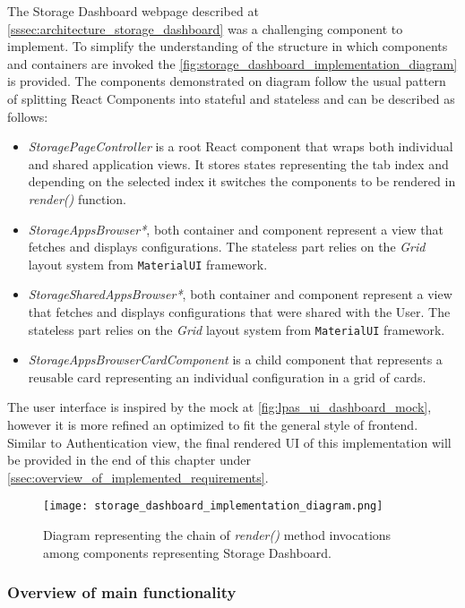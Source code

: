 The Storage Dashboard webpage described at \autoref{sssec:architecture_storage_dashboard} was a challenging component to implement. To simplify the understanding of the structure in which components and containers are invoked the \autoref{fig:storage_dashboard_implementation_diagram} is provided. The components demonstrated on diagram follow the usual pattern of splitting React Components into stateful and stateless and can be described as follows:
\begin{itemize}
	\item \textit{StoragePageController} is a root React component that wraps both individual and shared application views. It stores states representing the tab index and depending on the selected index it switches the components to be rendered in \textit{render()} function.
	\item \textit{StorageAppsBrowser*}, both container and component represent a view that fetches and displays \lpa{} configurations. The stateless part relies on the \textit{Grid} layout system from \texttt{MaterialUI} framework.
	\item \textit{StorageSharedAppsBrowser*}, both container and component represent a view that fetches and displays \lpa{} configurations that were shared with the User. The stateless part relies on the \textit{Grid} layout system from \texttt{MaterialUI} framework.
	\item \textit{StorageAppsBrowserCardComponent} is a child component that represents a reusable card representing an individual \lpa{} configuration in a grid of cards.
\end{itemize}

The user interface is inspired by the mock at \autoref{fig:lpas_ui_dashboard_mock}, however it is more refined an optimized to fit the general style of \lpa{} frontend. Similar to Authentication view, the final rendered UI of this implementation will be provided in the end of this chapter under \autoref{ssec:overview_of_implemented_requirements}.

\begin{figure}[h]
\centering
\texttt{[image: storage\_dashboard\_implementation\_diagram.png]}
\caption{Diagram representing the chain of \textit{render()} method invocations among components representing Storage Dashboard.}
\label{fig:storage_dashboard_implementation_diagram}
\end{figure}

\subsubsection{Overview of main functionality}

